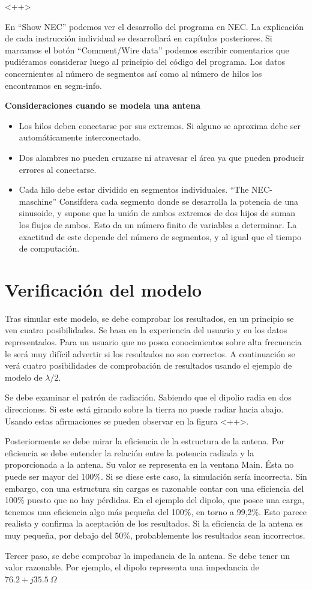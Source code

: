 \documentclass[12pt]{article}
\begin{document}
<++> 

En “Show NEC” podemos ver el desarrollo del programa en NEC. La explicación de
cada instrucción individual se desarrollará en capítulos posteriores. Si
marcamos el botón ``Comment/Wire data'' podemos escribir comentarios que
pudiéramos considerar luego al principio del código del programa. Los datos
concernientes al número de segmentos así como al número de hilos los
encontramos en segm-info.

\textbf{Consideraciones cuando se modela una antena}

\begin{itemize}%
    \item Los hilos deben conectarse por sus extremos. Si alguno se aproxima
	debe ser autom\'aticamente interconectado.
    \item Dos alambres no pueden cruzarse ni atravesar el \'area ya que pueden
	producir errores al conectarse.
    \item Cada hilo debe estar dividido en segmentos individuales. ``The
	NEC-maschine'' Consifdera cada segmento donde se desarrolla la potencia
	de una sinusoide, y supone que la uni\'on de ambos extremos de dos
	hijos de suman los flujos de ambos. Esto da un n\'umero finito de
	variables a determinar. La exactitud de este depende del n\'umero de
	segmentos, y al igual que el tiempo de computaci\'on.
\end{itemize}

\section{Verificaci\'on del modelo}

Tras simular este modelo, se debe comprobar los resultados, en un principio se
ven cuatro posibilidades. Se basa en la experiencia del usuario y en los datos
representados. Para un usuario que no posea conocimientos sobre alta frecuencia
le ser\'a muy difícil advertir si los resultados no son correctos. A
continuaci\'on se ver\'a cuatro posibilidades de comprobaci\'on de resultados
usando el ejemplo de modelo de $\lambda/2$.

Se debe examinar el patr\'on de radiaci\'on. Sabiendo que el dipolio radia en
dos direcciones. Si este est\'a girando sobre la tierra no puede radiar hacia
abajo. Usando estas afirmaciones se pueden observar en la figura <++>.

Posteriormente se debe mirar la eficiencia de la estructura de la antena. Por
eficiencia se debe entender la relación entre la potencia radiada y la
proporcionada a la antena. Su valor se representa en la ventana Main. Ésta no
puede ser mayor del 100\%. Si se diese este caso, la simulación sería
incorrecta. Sin embargo, con una estructura sin cargas es razonable contar con
una eficiencia del 100\% puesto que no hay pérdidas. En el ejemplo del dipolo,
que posee una carga, tenemos una eficiencia algo más pequeña del 100\%, en
torno a 99,2\%. Esto parece realista y confirma la aceptación de los
resultados. Si la eficiencia de la antena es muy pequeña, por debajo del 50\%,
probablemente los resultados sean incorrectos.

Tercer paso, se debe comprobar la impedancia de la antena. Se debe tener un
valor razonable. Por ejemplo, el dipolo representa una impedancia de
$76.2+j35.5\ \Omega$
\end{document}
